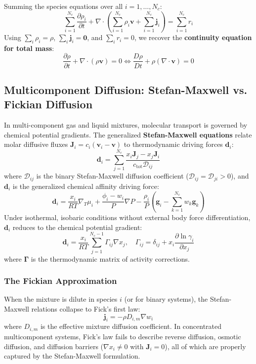 \documentclass[11pt,a4paper]{article}
\begin{document}
Summing the species equations over all $i = 1, \dots, N_c$:
\begin{equation}
\sum_{i=1}^{N_c} \frac{\partial \rho_i}{\partial t} + \nabla \cdot \left( \sum_{i=1}^{N_c} \rho_i \mathbf{v} + \sum_{i=1}^{N_c} \mathbf{j}_i \right) = \sum_{i=1}^{N_c} r_i
\end{equation}
Using $\sum_i \rho_i = \rho$, $\sum_i \mathbf{j}_i = \mathbf{0}$, and $\sum_i r_i = 0$, we recover the \textbf{continuity equation for total mass}:
\begin{equation}
\frac{\partial \rho}{\partial t} + \nabla \cdot (\rho \mathbf{v}) = 0 \iff \frac{D\rho}{Dt} + \rho (\nabla \cdot \mathbf{v}) = 0
\end{equation}

\subsection{Multicomponent Diffusion: Stefan-Maxwell vs. Fickian Diffusion}

In multi-component gas and liquid mixtures, molecular transport is governed by chemical potential gradients. The generalized \textbf{Stefan-Maxwell equations} relate molar diffusive fluxes $\mathbf{J}_i = c_i (\mathbf{v}_i - \mathbf{v})$ to thermodynamic driving forces $\mathbf{d}_i$:
\begin{equation}
\mathbf{d}_i = \sum_{j=1}^{N_c} \frac{x_i \mathbf{J}_j - x_j \mathbf{J}_i}{c_{\text{tot}} \mathcal{D}_{ij}}
\end{equation}
where $\mathcal{D}_{ij}$ is the binary Stefan-Maxwell diffusion coefficient ($\mathcal{D}_{ij} = \mathcal{D}_{ji} > 0$), and $\mathbf{d}_i$ is the generalized chemical affinity driving force:
\begin{equation}
\mathbf{d}_i = \frac{x_i}{RT} \nabla_T \mu_i + \frac{\phi_i - w_i}{P} \nabla P - \frac{\rho_i}{P} \left( \mathbf{g}_i - \sum_{k=1}^{N_c} w_k \mathbf{g}_k \right)
\end{equation}
Under isothermal, isobaric conditions without external body force differentiation, $\mathbf{d}_i$ reduces to the chemical potential gradient:
\begin{equation}
\mathbf{d}_i = \frac{x_i}{RT} \sum_{j=1}^{N_c-1} \Gamma_{ij} \nabla x_j, \quad \Gamma_{ij} = \delta_{ij} + x_i \frac{\partial \ln \gamma_i}{\partial x_j}
\end{equation}
where $\boldsymbol{\Gamma}$ is the thermodynamic matrix of activity corrections.

\subsubsection{The Fickian Approximation}
When the mixture is dilute in species $i$ (or for binary systems), the Stefan-Maxwell relations collapse to Fick's first law:
\begin{equation}
\mathbf{j}_i = -\rho D_{i, m} \nabla w_i
\end{equation}
where $D_{i, m}$ is the effective mixture diffusion coefficient. In concentrated multicomponent systems, Fick's law fails to describe reverse diffusion, osmotic diffusion, and diffusion barriers ($\nabla x_i \ne 0$ with $\mathbf{J}_i = 0$), all of which are properly captured by the Stefan-Maxwell formulation.
\end{document}
